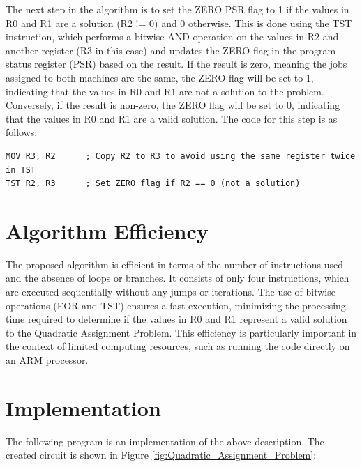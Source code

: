 The next step in the algorithm is to set the ZERO PSR flag to 1 if the values in R0 and R1 are a solution (R2 != 0) and 0 otherwise. This is done using the TST instruction, which performs a bitwise AND operation on the values in R2 and another register (R3 in this case) and updates the ZERO flag in the program status register (PSR) based on the result. If the result is zero, meaning the jobs assigned to both machines are the same, the ZERO flag will be set to 1, indicating that the values in R0 and R1 are not a solution to the problem. Conversely, if the result is non-zero, the ZERO flag will be set to 0, indicating that the values in R0 and R1 are a valid solution. The code for this step is as follows:

\begin{verbatim}
MOV R3, R2      ; Copy R2 to R3 to avoid using the same register twice in TST
TST R2, R3      ; Set ZERO flag if R2 == 0 (not a solution)
\end{verbatim}

\section{Algorithm Efficiency}

The proposed algorithm is efficient in terms of the number of instructions used and the absence of loops or branches. It consists of only four instructions, which are executed sequentially without any jumps or iterations. The use of bitwise operations (EOR and TST) ensures a fast execution, minimizing the processing time required to determine if the values in R0 and R1 represent a valid solution to the Quadratic Assignment Problem. This efficiency is particularly important in the context of limited computing resources, such as running the code directly on an ARM processor.



\section{Implementation}

The following program is an implementation of the above description. The created circuit is shown in Figure \ref{fig:Quadratic_Assignment_Problem}:

